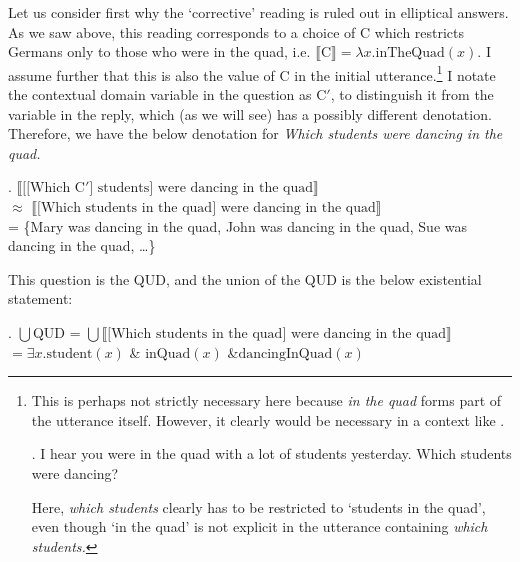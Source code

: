 \documentclass[doublespace]{umthesis}
\newcommand{\ext}[1]{\ensuremath{\llbracket \textrm{{#1}} \rrbracket}}
\newcommand{\pred}[1]{\ensuremath{\mathrm{{#1}}}}
\begin{document}
Let us consider first why the `corrective' reading is ruled out in elliptical answers.
As we saw above, this reading corresponds to a choice of C which restricts Germans only to those who were in the quad, i.e. $\ext{C} = \lambda x. \pred{inTheQuad}(x)$.
I assume further that this is also the value of C in the initial utterance.\footnote{This is perhaps not strictly necessary here because {\it in the quad} forms part of the utterance itself.
However, it clearly would be necessary in a context like \Next.

\ex. 	I hear you were in the quad with a lot of students yesterday.
	Which students were dancing?
	
Here, {\it which students} clearly has to be restricted to `students in the quad', even though `in the quad' is not explicit in the utterance containing {\it which students.}}
I notate the contextual domain variable in the question as C$'$, to distinguish it from the variable in the reply, which (as we will see) has a possibly different denotation.
Therefore, we have the below denotation for \it{Which students were dancing in the quad}.

\ex. 	\ext{[[Which C$'$] students] were dancing in the quad}\\
	$\approx$ \ext{[Which students in the quad] were dancing in the quad}\\
	= \{Mary was dancing in the quad, John was dancing in the quad, Sue was dancing in the quad, \ldots\}
	
This question is the QUD, and the union of the QUD is the below existential statement:

\ex.	$\bigcup$QUD = $\bigcup$\ext{[Which students in the quad] were dancing in the quad}\\
	$= \exists x. \pred{student}(x) $ \& $\pred{inQuad}(x)$ \&$ \pred{dancingInQuad}(x)$
	
\end{document}
